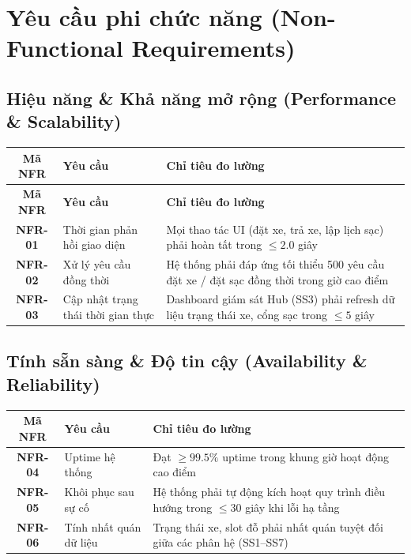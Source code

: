 \documentclass[12pt,a4paper]{report}
\begin{document}
{\let\clearpage\relax
\chapter{Yêu cầu phi chức năng (Non-Functional Requirements)}}

\section{Hiệu năng \& Khả năng mở rộng (Performance \& Scalability)}

\begin{longtable}{|c|p{4cm}|p{7cm}|}
    \hline
    \textbf{Mã NFR} & \textbf{Yêu cầu} & \textbf{Chỉ tiêu đo lường} \\
    \hline
    \endfirsthead
    \hline
    \textbf{Mã NFR} & \textbf{Yêu cầu} & \textbf{Chỉ tiêu đo lường} \\
    \hline
    \endhead
    \textbf{NFR-01} & Thời gian phản hồi giao diện & Mọi thao tác UI (đặt xe, trả xe, lập lịch sạc) phải hoàn tất trong $\le 2.0$ giây \\
    \hline
    \textbf{NFR-02} & Xử lý yêu cầu đồng thời & Hệ thống phải đáp ứng tối thiểu 500 yêu cầu đặt xe / đặt sạc đồng thời trong giờ cao điểm \\
    \hline
    \textbf{NFR-03} & Cập nhật trạng thái thời gian thực & Dashboard giám sát Hub (SS3) phải refresh dữ liệu trạng thái xe, cổng sạc trong $\le 5$ giây \\
    \hline
\end{longtable}

\section{Tính sẵn sàng \& Độ tin cậy (Availability \& Reliability)}

\begin{longtable}{|c|p{4cm}|p{7cm}|}
    \hline
    \textbf{Mã NFR} & \textbf{Yêu cầu} & \textbf{Chỉ tiêu đo lường} \\
    \hline
    \textbf{NFR-04} & Uptime hệ thống & Đạt $\ge 99.5\%$ uptime trong khung giờ hoạt động cao điểm \\
    \hline
    \textbf{NFR-05} & Khôi phục sau sự cố & Hệ thống phải tự động kích hoạt quy trình điều hướng trong $\le 30$ giây khi lỗi hạ tầng \\
    \hline
    \textbf{NFR-06} & Tính nhất quán dữ liệu & Trạng thái xe, slot đỗ phải nhất quán tuyệt đối giữa các phân hệ (SS1--SS7) \\
    \hline
\end{longtable}
\end{document}
